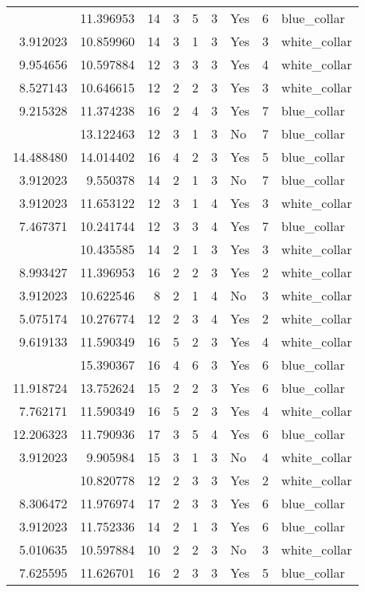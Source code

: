 \documentclass[
]{article}
\begin{document}
\begin{longtable}[t]{rrrrrllrl}
\addlinespace
7.346010 & 11.396953 & 14 & 3 & 5 & 3 & Yes & 6 & blue\_collar\\
3.912023 & 10.859960 & 14 & 3 & 1 & 3 & Yes & 3 & white\_collar\\
9.954656 & 10.597884 & 12 & 3 & 3 & 3 & Yes & 4 & white\_collar\\
8.527143 & 10.646615 & 12 & 2 & 2 & 3 & Yes & 3 & white\_collar\\
9.215328 & 11.374238 & 16 & 2 & 4 & 3 & Yes & 7 & blue\_collar\\
\addlinespace
3.912023 & 13.122463 & 12 & 3 & 1 & 3 & No & 7 & blue\_collar\\
14.488480 & 14.014402 & 16 & 4 & 2 & 3 & Yes & 5 & blue\_collar\\
3.912023 & 9.550378 & 14 & 2 & 1 & 3 & No & 7 & blue\_collar\\
3.912023 & 11.653122 & 12 & 3 & 1 & 4 & Yes & 3 & white\_collar\\
7.467371 & 10.241744 & 12 & 3 & 3 & 4 & Yes & 7 & blue\_collar\\
\addlinespace
3.912023 & 10.435585 & 14 & 2 & 1 & 3 & Yes & 3 & white\_collar\\
8.993427 & 11.396953 & 16 & 2 & 2 & 3 & Yes & 2 & white\_collar\\
3.912023 & 10.622546 & 8 & 2 & 1 & 4 & No & 3 & white\_collar\\
5.075174 & 10.276774 & 12 & 2 & 3 & 4 & Yes & 2 & white\_collar\\
9.619133 & 11.590349 & 16 & 5 & 2 & 3 & Yes & 4 & white\_collar\\
\addlinespace
13.797398 & 15.390367 & 16 & 4 & 6 & 3 & Yes & 6 & blue\_collar\\
11.918724 & 13.752624 & 15 & 2 & 2 & 3 & Yes & 6 & blue\_collar\\
7.762171 & 11.590349 & 16 & 5 & 2 & 3 & Yes & 4 & white\_collar\\
12.206323 & 11.790936 & 17 & 3 & 5 & 4 & Yes & 6 & blue\_collar\\
3.912023 & 9.905984 & 15 & 3 & 1 & 3 & No & 4 & white\_collar\\
\addlinespace
6.309918 & 10.820778 & 12 & 2 & 3 & 3 & Yes & 2 & white\_collar\\
8.306472 & 11.976974 & 17 & 2 & 3 & 3 & Yes & 6 & blue\_collar\\
3.912023 & 11.752336 & 14 & 2 & 1 & 3 & Yes & 6 & blue\_collar\\
5.010635 & 10.597884 & 10 & 2 & 2 & 3 & No & 3 & white\_collar\\
7.625595 & 11.626701 & 16 & 2 & 3 & 3 & Yes & 5 & blue\_collar\\

\end{longtable}
\end{document}
